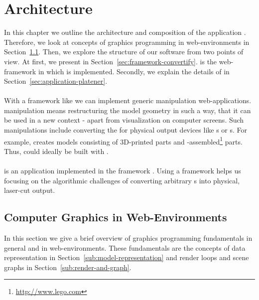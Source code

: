 \documentclass[../ClassicThesis.tex]{subfiles}
\begin{document}
\newcommand\myNotes[1]{\textcolor{red}{#1}}
\newcommand{\class}[1]{\emph{#1}}


\chapter{Architecture}
\label{ch:architecture}

In this chapter we outline the architecture and composition of the
application {\platener}. Therefore, we look at concepts of graphics
programming in web-environments in Section~\ref{sec:cg-web}. Then, we
explore the structure of our software from two points of view. At
first, we present {\convertify} in
Section~\ref{sec:framework-convertify}. {\convertify} is the
web-framework in which {\platener} is implemented. Secondly, we
explain the details of {\platener} in
Section~\ref{sec:application-platener}.\\
\\
With a framework like {\convertify} we can implement generic
{\threedmodel} manipulation web-applications. {\threedmodel}
manipulation means restructuring the model geometry in such a way,
that it can be used in a new context - apart from visualization on
computer screens. Such manipulations include converting the
{\threedmodel} for physical output devices like {\threedprinter}s or
{\lasercutter}s. For example, {\brickify} creates models consisting of
3D-printed parts and
{\lego}-assembled\footnote{\url{http://www.lego.com}} parts. Thus,
{\brickify} could ideally be built with {\convertify}.\\
\\
{\platener} is an application implemented in the framework {\convertify}.
Using a framework helps us focusing on the algorithmic challenges of
converting arbitrary {\threedmodel}s into physical, laser-cut output.

\section{Computer Graphics in Web-Environments}
\label{sec:cg-web}

In this section we give a brief overview of graphics programming
fundamentals in general and in web-environments. These fundamentals
are the concepts of {\threedmodel} data representation in
Section~\ref{sub:model-representation} and render loops and scene
graphs in Section~\ref{sub:render-and-graph}.
\end{document}
